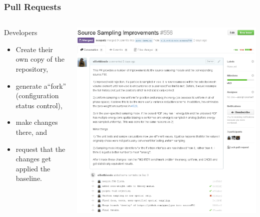 \documentclass[12pt]{beamer}
\begin{document}
\begin{frame}
\frametitle{Pull Requests}

\begin{columns}
\begin{column}{0.5\textwidth}

Developers
    \begin{itemize}
    \item Create their own copy of the repository,
    \item generate a``fork'' (\alert{configuration status control}), 
    \item make changes there, and 
    \item request that the changes get applied the baseline.
    \end{itemize}
\end{column}
\begin{column}{0.5\textwidth}
    \includegraphics[width=\textwidth]{figures/PR_prop.png}
\end{column}
\end{columns}

\end{frame}
\end{document}
